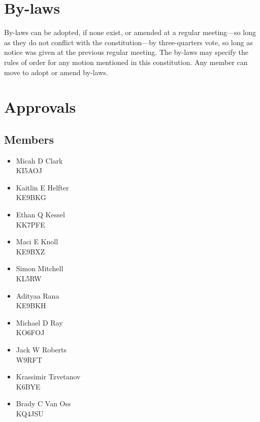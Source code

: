 \documentclass{article}
\begin{document}
\section{By-laws}

By-laws can be adopted, if none exist, or amended at a regular meeting---so long
as they do not conflict with the constitution---by three-quarters vote, so long
as notice was given at the previous regular meeting. The by-laws may specify the
rules of order for any motion mentioned in this constitution. Any member can
move to adopt or amend by-laws.

\newpage

\section*{Approvals}

\vspace{4ex}

\subsection*{Members}

\begin{minipage}{0.47\textwidth}
    \begin{itemize}
        \item Micah D Clark \\ KI5AOJ
        \item Kaitlin E Helfter \\ KE9BKG
        \item Ethan Q Kessel \\ KK7PFE
        \item Maci E Knoll \\ KE9BXZ
        \item Simon Mitchell \\ KL5RW
    \end{itemize}
\end{minipage}
\hfill
\begin{minipage}{0.47\textwidth}
    \begin{itemize}
        \item Adityaa Rana \\ KE9BKH
        \item Michael D Ray \\ KO6FOJ
        \item Jack W Roberts \\ W9RFT
        \item Krassimir Tzvetanov \\ K6BYE
        \item Brady C Van Oss \\ KQ4JSU
    \end{itemize}
\end{minipage}
\end{document}
